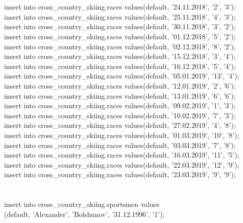 \documentclass[a4paper,12pt]{article}
\begin{document}
\\
\\
insert into cross\_country\_skiing.races values(default, '24.11.2018', '2', '3');\\
insert into cross\_country\_skiing.races values(default, '25.11.2018', '4', '3');\\
insert into cross\_country\_skiing.races values(default, '30.11.2018', '3', '2');\\
insert into cross\_country\_skiing.races values(default, '01.12.2018', '5', '2');\\
insert into cross\_country\_skiing.races values(default, '02.12.2018', '8', '2');\\
insert into cross\_country\_skiing.races values(default, '15.12.2018', '3', '4');\\
insert into cross\_country\_skiing.races values(default, '16.12.2018', '5', '4');\\
insert into cross\_country\_skiing.races values(default, '05.01.2019', '13',  '4');\\
insert into cross\_country\_skiing.races values(default, '12.01.2019', '2', '6');\\
insert into cross\_country\_skiing.races values(default, '13.01.2019', '6', '6');\\
insert into cross\_country\_skiing.races values(default, '09.02.2019', '1', '3');\\
insert into cross\_country\_skiing.races values(default, '10.02.2019', '7', '3');\\
insert into cross\_country\_skiing.races values(default, '27.02.2019', '4', '8');\\
insert into cross\_country\_skiing.races values(default, '01.03.2019', '10',  '8');\\
insert into cross\_country\_skiing.races values(default, '03.03.2019', '7', '8');\\
insert into cross\_country\_skiing.races values(default, '16.03.2019', '11',  '5');\\
insert into cross\_country\_skiing.races values(default, '22.03.2019', '12',  '9');\\
insert into cross\_country\_skiing.races values(default, '23.03.2019', '9', '9');\\
\\
\\
insert into cross\_country\_skiing.sportsmen values \\
\indent \indent \indent \indent \indent \indent \indent (default, 'Alexander', 'Bolshunov', '31.12.1996',  '1');\\
\end{document}
